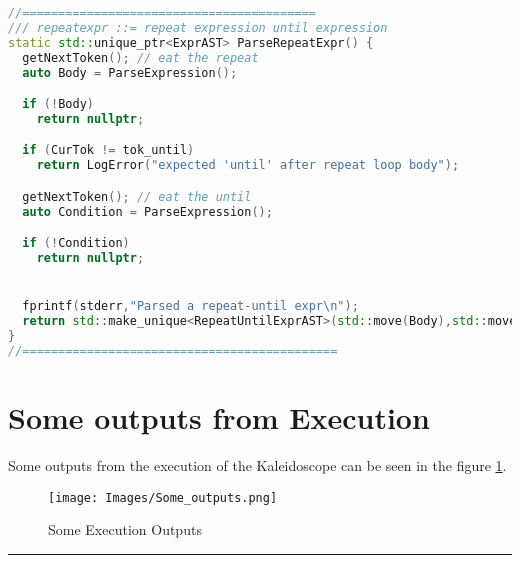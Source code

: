 \documentclass[16pt]{article}
\begin{document}
\vspace{2.5pt}
\begin{lstlisting}[caption=ParseRepeatExpr function parses the repeat-until loop construct, label=ParseRepeatExpr-function,
style=chstyle,language=C++]
//=========================================
/// repeatexpr ::= repeat expression until expression
static std::unique_ptr<ExprAST> ParseRepeatExpr() {
  getNextToken(); // eat the repeat
  auto Body = ParseExpression();

  if (!Body)
    return nullptr;

  if (CurTok != tok_until)
    return LogError("expected 'until' after repeat loop body");  

  getNextToken(); // eat the until
  auto Condition = ParseExpression();

  if (!Condition) 
    return nullptr;


  fprintf(stderr,"Parsed a repeat-until expr\n");
  return std::make_unique<RepeatUntilExprAST>(std::move(Body),std::move(Condition));
}
//============================================
\end{lstlisting}

\newpage
\section*{Some outputs from Execution}
Some outputs from the execution of the Kaleidoscope can be seen in the figure \ref{execution-outputs}.

\begin{figure}[!h]
    \centering
    \texttt{[image: Images/Some\_outputs.png]}
    \caption{Some Execution Outputs}
    \label{execution-outputs}
\end{figure}

   
\clearpage
\hrule 
\printbibliography[title={References}] %
\end{document}

